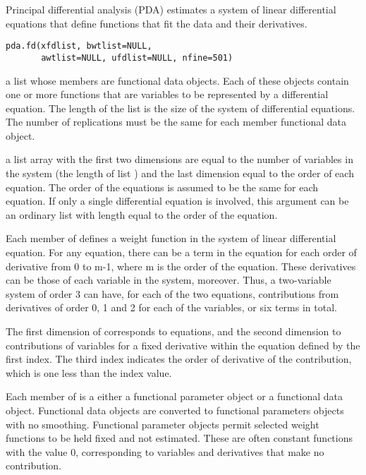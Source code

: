 \documentclass{article}
\begin{document}
\begin{Description}\relax
Principal differential analysis (PDA) estimates a
system of linear differential equations that define functions
that fit the data and their derivatives.
\end{Description}
\begin{Usage}
\begin{verbatim}
pda.fd(xfdlist, bwtlist=NULL,
       awtlist=NULL, ufdlist=NULL, nfine=501)
\end{verbatim}
\end{Usage}
\begin{Arguments}
\begin{ldescription}
\item[\code{xfdlist}] a list whose members are functional data objects.  Each of these objects
contain one or more functions that are variables to be represented
by a differential equation.  The length of the list is the size of the
system of differential equations. The number of replications must be
the same for each member functional data object.

\item[\code{bwtlist}] a list array with the first two dimensions are equal to the number of
variables in the system (the length of list ) and
the last dimension equal to the order of each equation.  The order of
the equations is assumed to be the same for each equation.  If only a
single differential equation is involved, this argument can be an
ordinary list with length equal to the order of the equation.

Each member of  defines a weight function
in the system of linear differential equation.  For any equation,
there can be a term in the equation for each order of derivative
from 0 to m-1, where m is the order of the equation.  These derivatives
can be those of each variable in the system, moreover.  Thus, a two-variable
system of order 3 can have, for each of the two equations, contributions
from derivatives of order 0, 1 and 2 for each of the variables, or
six terms in total.

The first dimension of  corresponds to equations,
and the second dimension to contributions of variables for a fixed derivative
within the equation defined by the first index.  The third index indicates
the order of derivative of the contribution, which is one less than the
index value.

Each member of  is a either a functional
parameter object or a functional data object.  Functional data objects
are converted to functional parameters objects with no smoothing.
Functional parameter objects permit selected weight functions to be
held fixed and not estimated.  These are often constant functions with
the value 0, corresponding to variables and derivatives that make no
contribution.


\end{ldescription}
\end{Arguments}
\end{document}
